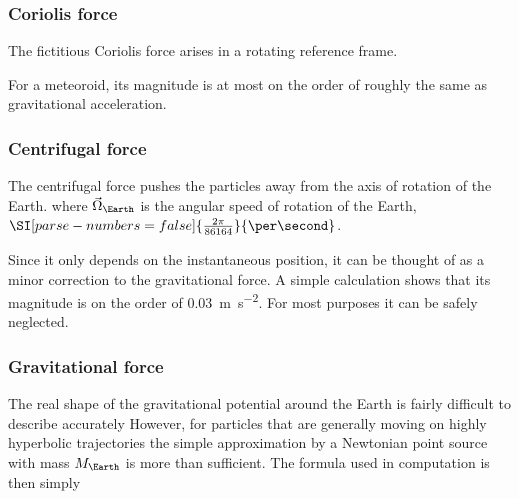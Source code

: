         \subsubsection{Coriolis force} \label{aafC}
            The fictitious Coriolis force arises in a rotating reference frame.

            For a meteoroid, its magnitude is at most on the order of
            roughly the same as gravitational acceleration.

        \subsubsection{Centrifugal force} \label{aafc}
            The centrifugal force pushes the particles away from the axis of rotation of the Earth.
            where $\vec{\Omega}_\Earth$ is the angular speed of rotation of the Earth, $\SI[parse-numbers = false]{\frac{2\pi}{86164}}{\per\second}$.

            Since it only depends on the instantaneous position, it can be thought of as a minor correction to the
            gravitational force. A simple calculation shows that its magnitude is on the order
            of \SI{0.03}{\metre\per\second\squared}. For most purposes it can be safely neglected.

        \subsubsection{Gravitational force} \label{aafg}
            The real shape of the gravitational potential around the Earth is fairly difficult to describe accurately
            However, for particles that are generally moving on highly hyperbolic trajectories the
            simple approximation by a Newtonian point source with mass $M_\Earth$ is more than sufficient.
            The formula used in computation is then simply

